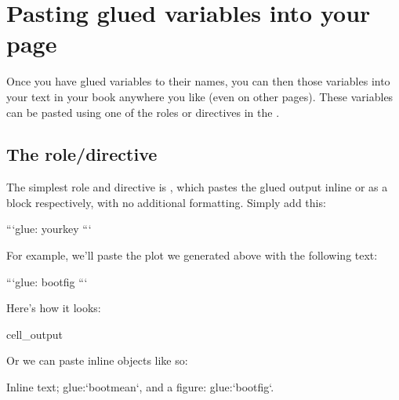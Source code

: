 \documentclass[letterpaper,10pt,english]{jupyterBook}
\begin{document}
\section{Pasting glued variables into your page}
\label{\detokenize{overview:pasting-glued-variables-into-your-page}}\label{\detokenize{overview:glue-pasting}}
\sphinxAtStartPar
Once you have glued variables to their names, you can then 
those variables into your text in your book anywhere you like (even on other pages).
These variables can be pasted using one of the roles or directives in the  .


\subsection{The  role/directive}
\label{\detokenize{overview:the-glue-role-directive}}
\sphinxAtStartPar
The simplest role and directive is ,
which pastes the glued output in\sphinxhyphen{}line or as a block respectively,
with no additional formatting.
Simply add this:

\begin{sphinxVerbatim}[commandchars=\\\{\}]
```\PYGZob{}glue:\PYGZcb{} your\PYGZhy{}key
```
\end{sphinxVerbatim}

\sphinxAtStartPar
For example, we’ll paste the plot we generated above with the following text:

\begin{sphinxVerbatim}[commandchars=\\\{\}]
```\PYGZob{}glue:\PYGZcb{} boot\PYGZus{}fig
```
\end{sphinxVerbatim}

\sphinxAtStartPar
Here’s how it looks:
\begin{sphinxVerbatimOutput}

\begin{sphinxuseclass}{cell_output}
\noindent{}

\end{sphinxuseclass}\end{sphinxVerbatimOutput}

\sphinxAtStartPar
Or we can paste in\sphinxhyphen{}line objects like so:

\begin{sphinxVerbatim}[commandchars=\\\{\}]
In\PYGZhy{}line text; \PYGZob{}glue:\PYGZcb{}`boot\PYGZus{}mean`, and a figure: \PYGZob{}glue:\PYGZcb{}`boot\PYGZus{}fig`.
\end{sphinxVerbatim}
\end{document}
